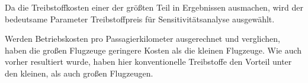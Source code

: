 Da die Treibstoffkosten einer der größten Teil in Ergebnissen ausmachen, wird der bedeutsame Parameter 
Treibstoffpreis für Sensitivitätsanalyse ausgewählt.

Werden Betriebskosten pro Passagierkilometer ausgerechnet und verglichen, haben die großen Flugzeuge geringere Kosten als die kleinen Flugzeuge.
Wie auch vorher resultiert wurde, haben hier konventionelle Treibstoffe den Vorteil unter den kleinen, als auch großen Flugzeugen.
